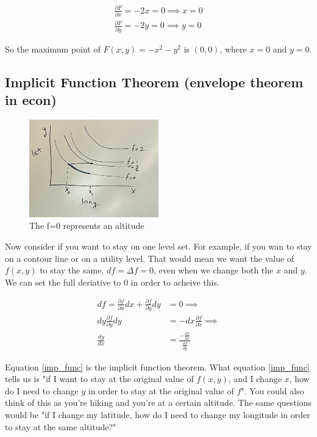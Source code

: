 \documentclass{article}
\begin{document}
\begin{align}
    \frac{\partial F}{\partial x} = -2x = 0 \implies x = 0\\
    \frac{\partial F}{\partial y} = -2y = 0 \implies y = 0
\end{align}

So the maximum point of $F(x,y) = -x^2-y^2$ is $(0,0)$, where $x = 0 $ and $y = 0$. 

\subsection{Implicit Function Theorem (envelope theorem in econ)}

\begin{figure}[htp]
    \centering
        \includegraphics[width=0.5\textwidth]{Screen Shot 2023-09-27 at 10.59.32 AM.png}
    \caption{The f=0 represents an altitude}
\end{figure}

Now consider if you want to stay on one level set. For example, if you wan to stay on a contour line or on a utility level. That would mean we want the value of $f(x,y)$ to stay the same, $df = \Delta f = 0$, even when we change both the $x$ and $y$. We can set the full deriative to 0 in order to acheive this. 

\begin{align}
    d f = \frac{\partial f}{\partial x} dx + \frac{\partial f}{\partial y} dy &= 0 \implies \\
    dy \frac{\partial f}{\partial y} dy &= - dx \frac{\partial f}{\partial x} \implies \\
    \frac{d y}{dx} &= \frac{- \frac{\partial f}{\partial x}}{\frac{\partial f}{\partial y}} \label{imp_func}
\end{align}

Equation \ref{imp_func} is the implicit function theorem. What equation \ref{imp_func} tells us is "if I want to stay at the original value of $f(x,y)$, and I change $x$, how do I need to change $y$ in order to stay at the original value of $f$". You could also think of this as you're hiking and you're at a certain altitude. The same questions would be "if I change my latitude, how do I need to change my longitude in order to stay at the same altitude?"\\
\end{document}
